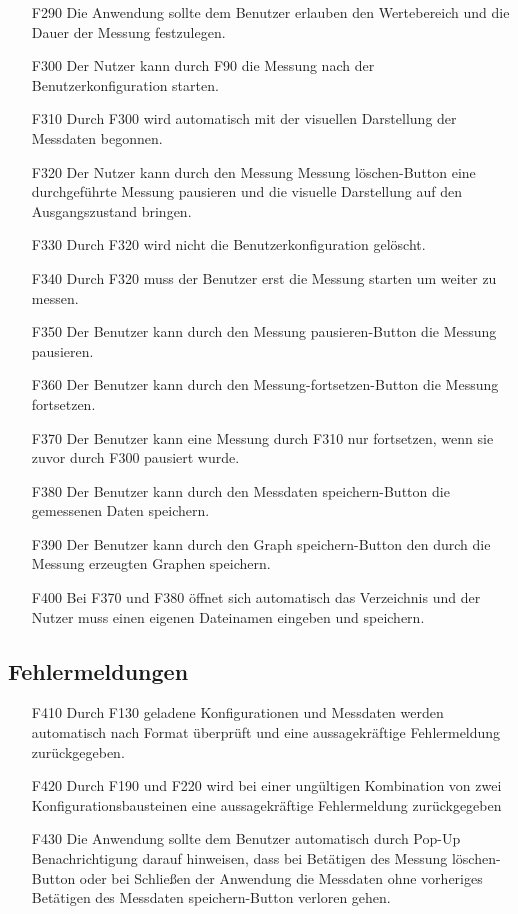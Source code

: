 \documentclass[parskip=full]{scrartcl}
\begin{document}
\begin{itemize}

\item[F290] Die Anwendung sollte dem Benutzer erlauben den Wertebereich und die Dauer der Messung festzulegen.
\item[F300] Der Nutzer kann durch F90 die Messung nach der Benutzerkonfiguration starten.
\item[F310] Durch F300 wird automatisch mit der visuellen Darstellung der Messdaten begonnen.
\item[F320] Der Nutzer kann durch den Messung Messung löschen-Button eine durchgeführte Messung pausieren und die visuelle Darstellung auf den Ausgangszustand bringen.
\item[F330] Durch F320 wird nicht die Benutzerkonfiguration gelöscht.
\item[F340] Durch F320 muss der Benutzer erst die Messung starten um weiter zu messen.
\item[F350] Der Benutzer kann durch den Messung pausieren-Button die Messung pausieren.
\item[F360] Der Benutzer kann durch den Messung-fortsetzen-Button die Messung fortsetzen.
\item[F370] Der Benutzer kann eine Messung durch F310 nur fortsetzen, wenn sie zuvor durch F300 pausiert wurde.
\item[F380] Der Benutzer kann durch den Messdaten speichern-Button die gemessenen Daten speichern.
\item[F390] Der Benutzer kann durch den Graph speichern-Button den durch die Messung erzeugten Graphen speichern.
\item[F400] Bei F370 und F380 öffnet sich automatisch das Verzeichnis und der Nutzer muss einen eigenen Dateinamen eingeben und speichern. 

\end{itemize}

\subsection{Fehlermeldungen}

\begin{itemize}
\item[F410] Durch F130 geladene Konfigurationen und Messdaten werden automatisch nach Format überprüft und eine aussagekräftige Fehlermeldung zurückgegeben.
\item[F420] Durch F190 und F220 wird bei einer ungültigen Kombination von zwei Konfigurationsbausteinen eine aussagekräftige Fehlermeldung zurückgegeben
\item[F430] Die Anwendung sollte dem Benutzer automatisch durch Pop-Up Benachrichtigung darauf hinweisen, dass bei Betätigen des Messung löschen-Button oder bei Schließen der Anwendung die Messdaten ohne vorheriges Betätigen des Messdaten speichern-Button verloren gehen.

\end{itemize}
\end{document}
